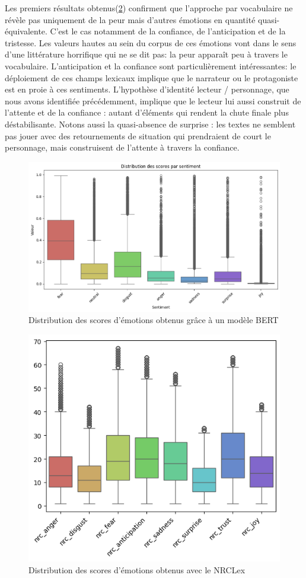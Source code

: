\documentclass[12pt,a4paper,oneside,titlepage]{book} %
\begin{document}
Les premiers résultats obtenus(\ref{fig:emotions_nrc}) confirment que l'approche par vocabulaire ne révèle pas uniquement de la peur mais d'autres émotions en quantité quasi-équivalente. C'est le cas notamment de la confiance, de l'anticipation et de la tristesse. 
Les valeurs hautes au sein du corpus de ces émotions vont dans le sens d'une littérature horrifique qui ne se dit pas:  la peur apparaît peu à travers le vocabulaire. L'anticipation et la confiance sont particulièrement intéressantes: le déploiement de ces champs lexicaux implique que le narrateur ou le protagoniste est en proie à ces sentiments. L'hypothèse d'identité lecteur / personnage, que nous avons identifiée précédemment, implique que le lecteur lui aussi construit de l'attente et de la confiance : autant d'éléments qui rendent la chute finale plus déstabilisante. 
Notons aussi la quasi-absence de surprise : les textes ne semblent pas jouer avec des retournements de situation qui prendraient de court le personnage, mais construisent de l'attente à travers la confiance. 




\begin{figure}
    \centering
    \includegraphics[width=0.5\linewidth]{illustration/emotions_bert.png}
    \caption{Distribution des scores d'émotions obtenus grâce à un modèle BERT}
    \label{fig:bert_emotion}
\end{figure}



\begin{figure}
    \centering
    \includegraphics[width=0.5\linewidth]{illustration/nrc_emotionspng.png}
    \caption{Distribution des scores d'émotions obtenus avec le NRCLex}
    \label{fig:emotions_nrc}
\end{figure}
\end{document}
